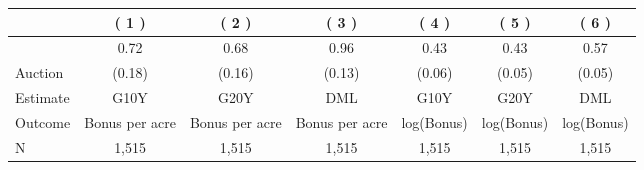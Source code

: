 
\begin{tabular}{lcccccc}
\toprule
 & ( 1 ) & ( 2 ) & ( 3 ) & ( 4 ) & ( 5 ) & ( 6 )\\
\midrule
 & 0.72 & 0.68 & 0.96 & 0.43 & 0.43 & 0.57\\

\multirow{-2}{*}{\raggedright\arraybackslash Auction} & (0.18) & (0.16) & (0.13) & (0.06) & (0.05) & (0.05)\\

\midrule
Estimate & G10Y & G20Y & DML & G10Y & G20Y & DML\\

Outcome & Bonus per acre & Bonus per acre & Bonus per acre & log(Bonus) & log(Bonus) & log(Bonus)\\
\midrule

N & 1,515 & 1,515 & 1,515 & 1,515 & 1,515 & 1,515\\
\bottomrule
\end{tabular}
